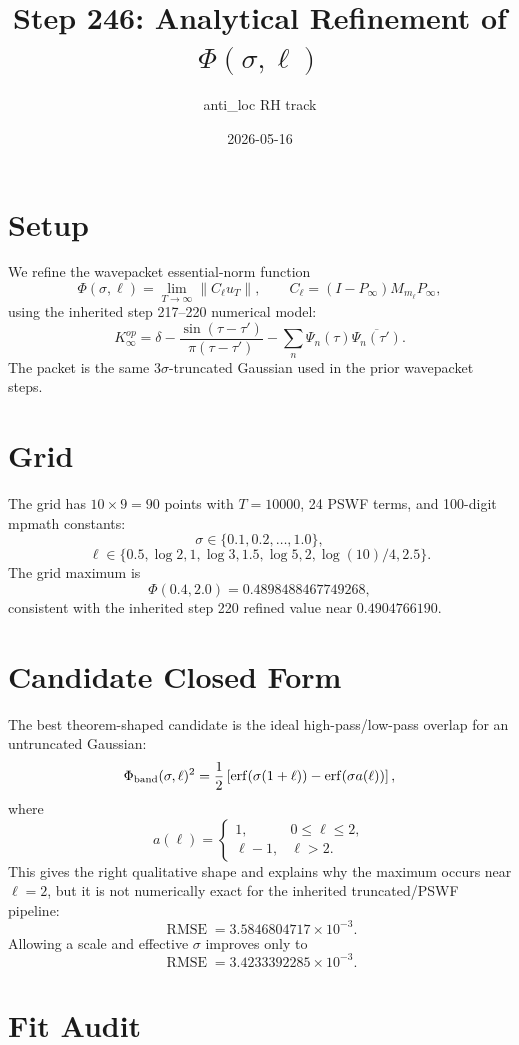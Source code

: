 \documentclass[11pt]{article}
\title{Step 246: Analytical Refinement of \(\Phi(\sigma,\ell)\)}
\author{anti\_loc RH track}
\date{2026-05-16}
\begin{document}
\maketitle

\section{Setup}

We refine the wavepacket essential-norm function
\[
  \Phi(\sigma,\ell)=\lim_{T\to\infty}\|C_\ell u_T\|,
  \qquad C_\ell=(I-P_\infty)M_{m_\ell}P_\infty,
\]
using the inherited step 217--220 numerical model:
\[
  K_\infty^{op}=\delta-\frac{\sin(\tau-\tau')}{\pi(\tau-\tau')}
  -\sum_n \Psi_n(\tau)\overline{\Psi_n(\tau')}.
\]
The packet is the same 3\(\sigma\)-truncated Gaussian used in the prior wavepacket steps.

\section{Grid}

The grid has \(10\times 9=90\) points with \(T=10000\), 24 PSWF terms, and 100-digit mpmath constants:
\[
\sigma\in\{0.1,0.2,\ldots,1.0\},
\]
\[
\ell\in\{0.5,\log2,1,\log3,1.5,\log5,2,\log(10)/4,2.5\}.
\]
The grid maximum is
\[
  \Phi(0.4,2.0)=0.4898488467749268,
\]
consistent with the inherited step 220 refined value near \(0.4904766190\).

\section{Candidate Closed Form}

The best theorem-shaped candidate is the ideal high-pass/low-pass overlap for an untruncated Gaussian:
\[
\Phi_{\rm band}(\sigma,\ell)^2 =
\frac12\left[
\operatorname{erf}(\sigma(1+\ell))-\operatorname{erf}(\sigma a(\ell))
\right],
\]
where
\[
a(\ell)=
\begin{cases}
1, & 0\le \ell\le 2,\\
\ell-1, & \ell>2.
\end{cases}
\]
This gives the right qualitative shape and explains why the maximum occurs near \(\ell=2\), but it is not numerically exact for the inherited truncated/PSWF pipeline:
\[
\operatorname{RMSE}=3.5846804717\times 10^{-3}.
\]
Allowing a scale and effective \(\sigma\) improves only to
\[
\operatorname{RMSE}=3.4233392285\times 10^{-3}.
\]

\section{Fit Audit}
\end{document}
